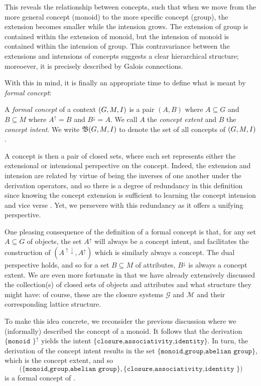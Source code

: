 This reveals the relationship between concepts, such that when we move from the more general concept (monoid) to the more specific concept (group),
the extension becomes smaller while the intension grows. The extension of group is contained within the extension of monoid, but the intension
of monoid is contained within the intension of group. This contravariance between the extensions and intensions of concepts suggests a clear
hierarchical structure; moreoever, it is precisely described by Galois connections.

With this in mind, it is finally an appropriate time to define what is meant by \textit{formal concept}:

\begin{definition}
    \label{definition:formal-concept} A \emph{formal concept} of a context $(G,M,\mathrel{I})$ is a
  pair $(A,B)$ where $A \subseteq G$ and $B\subseteq M$ where $A^{\uparrow}= B$ and $B^{\downarrow}= A$. We call $A$ the \emph{concept
  extent} and $B$ the \emph{concept intent}. We write ${\mathfrak B} (G,M,\mathrel{I})$ to denote the set of all concepts of $(G,M,\mathrel{I})$.
\end{definition}

A concept is then a pair of closed sets, where each set represents either the extensional or intensional perspective on the concept. Indeed,
the extension and intension are related by virtue of being the inverses of one another under the derivation operators, and so there is a degree
of redundancy in this definition since knowing the concept extension is sufficient to learning the concept intension and vice verse \cite{ganter2016conceptual}.
Yet, we persevere with this redundancy as it offers a unifying perspective.

One pleasing consequence of the definition of a formal concept is that, for any set $A\subseteq G$ of objects, the set $A^{\uparrow}$ will always
be a concept intent, and facilitates the construction of $(A^{\uparrow \downarrow}, A^{\uparrow})$ which is similarly always a concept. The dual
perspective holds, and so for a set $B \subseteq M$ of attributes, $B^{\downarrow}$ is always a concept extent. We are even more fortunate
in that we have already extensively discussed the collection(s) of closed sets of objects and attributes and what structure they might have:
of course, these are the closure systems $\mathcal{G}$ and $\mathcal{M}$ and their corresponding lattice structure.

To make this idea concrete, we reconsider the previous discussion where we (informally) described the concept of a monoid. It follows that the
derivation $\{\texttt{monoid }\}^{\uparrow}$ yields the intent $\{\texttt{closure,associativity,identity}\}$. In turn, the derivation of the
concept intent results in the set $\{\texttt{monoid,group,abelian group}\}$, which is the concept extent, and so
\[
  \big(\{\texttt{monoid,group,abelian group}\}, \{\texttt{closure,associativity,identity }\}\big)
\]
is a formal concept of .

